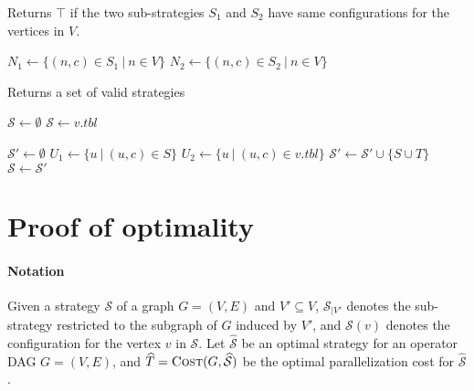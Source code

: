 \documentclass{article}
\newcommand{\strategy}{\mathcal{S}}
\newcommand{\optstrategy}{\widehat{\mathcal{S}}}
\newcommand{\optcost}{\widehat{T}}
\newcommand{\vertcost}[1]{t_V(#1)}
\newcommand{\edgecost}[1]{t_E(#1)}
\newcommand{\set}[1]{\{#1\}}
\begin{document}
\begin{algorithm}
	\caption{\label{alg:is-compatible}Returns $\top$ if the two
	sub-strategies $S_1$ and $S_2$ have same configurations for the
	vertices in $V$.}

	\begin{algorithmic}[1]
			\State $N_1 \leftarrow \set{(n,c)\in S_1~|~n \in V}$
			\State $N_2 \leftarrow \set{(n,c)\in S_2~|~n \in V}$
			\Statex

				\State \Return{$\bot$}
			\EndIf
			\Statex
			\State \Return{$\top$}
		\EndProcedure
	\end{algorithmic}
\end{algorithm}


\begin{algorithm}
	\caption{\label{alg:valid-strategies} Returns a set of valid strategies}

	\begin{algorithmic}[1]

		\State $\strategy \leftarrow \emptyset$
			\If{$\strategy = \emptyset$}
				\State $\strategy \leftarrow v.tbl$
				\State {}
			\EndIf

			\Statex

			\State $\strategy' \leftarrow \emptyset$
			\ForAll{$S \in \strategy$}
					\State $U_1 \leftarrow \set{u~|~(u,c)\in S}$
					\State $U_2 \leftarrow \set{u~|~(u,c)\in v.tbl}$
					\Statex
						\State $\strategy' \leftarrow \strategy' \cup \set{S\cup T}$
					\EndIf
				\EndFor
			\EndFor
			\State $\strategy \leftarrow \strategy'$
		\EndFor

		\Statex
		\State\Return{$\strategy$}

		\EndProcedure

	\end{algorithmic}
\end{algorithm}

\clearpage

\section{Proof of optimality}
\paragraph{Notation}
Given a strategy $\strategy$ of a graph $G=(V,E)$ and $V'\subseteq V$,
$\strategy_{|V'}$ denotes the sub-strategy restricted to the subgraph of $G$
induced by $V'$, and $\strategy(v)$ denotes the configuration for the vertex $v$
in $\strategy$.  
Let $\optstrategy$ be an optimal strategy for an operator DAG
$G=(V,E)$, and $\optcost = \Call{Cost}{G, \optstrategy}$
be the optimal parallelization cost for $\optstrategy$.
\end{document}
